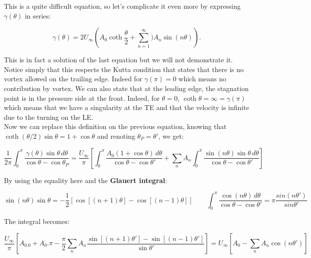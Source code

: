 	This is a quite difficult equation, so let's complicate it even more by expressing $\gamma (\theta )$ in series: 
	
	\begin{equation}
	\gamma (\theta ) = 2U_\infty \left(A_0 \coth \frac{\theta }{2} + \sum _{n=1}^\infty) A_n \sin (n\theta)\right).
	\end{equation}
	
	This is in fact a solution of the last equation but we will not demonstrate it. Notice simply that this respects the Kutta condition that states that there is no vortex allowed on the trailing edge. Indeed for $\gamma (\pi) = 0$  which means no contribution by vortex. We can also state that at the leading edge, the stagnation point is in the pressure side at the front. Indeed, for $\theta = 0$, $\coth \theta = \infty = \gamma (\pi )$ which means that we have a singularity at the TE and that the velocity is infinite due to the turning on the LE.  \\
	
	Now we can replace this definition on the previous equation, knowing that $\coth (\theta /2) \sin \theta = 1+\cos \theta$ and renoting $\theta _P = \theta '$, we get:
	
	\begin{equation}
	\frac{1}{2\pi} \int _0 ^{\pi} \frac{\gamma (\theta)\sin \theta \, d\theta}{\cos \theta - \cos \theta _P}  = \frac{U_\infty}{\pi} \left[ \int _0 ^{\pi} \frac{A_0 (1+\cos \theta ) \, d\theta}{\cos \theta - \cos \theta '} + \sum _n A_n \int _0 ^{\pi}  \frac{\sin (n\theta)\sin \theta \, d\theta}{\cos \theta - \cos \theta '}  \right]
	\end{equation}
	
	By using the equality here and the \textbf{Glauert integral}:
	
	\begin{equation}
	\sin (n\theta ) \sin \theta = - \frac{1}{2} [\cos [(n+1)\theta] - \cos [(n-1)\theta]] \qquad \int _0 ^\pi \frac{\cos (n\theta)\, d\theta}{\cos \theta - \cos \theta '} = \pi \frac{sin(n\theta ')}{sin \theta '}
	\end{equation}
	
	The integral becomes: 
	
	\begin{equation}
	\frac{U_\infty}{\pi} \left[ A_0.0 + A_0. \pi - \frac{\pi}{2} \sum _n A_n \frac{\sin [(n+1)\theta '] - \sin [(n-1)\theta ']}{\sin \theta '} \right] = U_\infty \left[ A_0 - \sum _n A_n \cos (n\theta ') \right]
	\end{equation}
	
